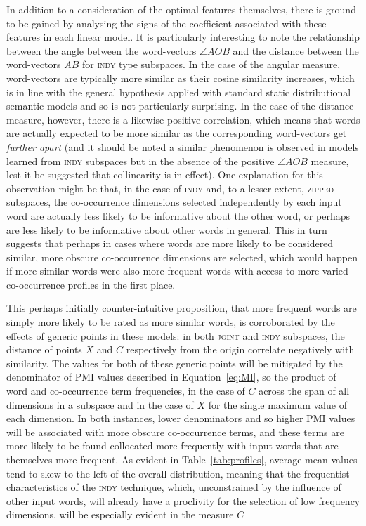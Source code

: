 In addition to a consideration of the optimal features themselves, there is ground to be gained by analysing the signs of the coefficient associated with these features in each linear model.  It is particularly interesting to note the relationship between the angle between the word-vectors $\angle AOB$ and the distance between the word-vectors $\overline{AB}$ for \textsc{indy} type subspaces.  In the case of the angular measure, word-vectors are typically more similar as their cosine similarity increases, which is in line with the general hypothesis applied with standard static distributional semantic models and so is not particularly surprising.  In the case of the distance measure, however, there is a likewise positive correlation, which means that words are actually expected to be more similar as the corresponding word-vectors get \emph{further apart} (and it should be noted a similar phenomenon is observed in models learned from \textsc{indy} subspaces but in the absence of the positive $\angle AOB$ measure, lest it be suggested that collinearity is in effect).  One explanation for this observation might be that, in the case of \textsc{indy} and, to a lesser extent, \textsc{zipped} subspaces, the co-occurrence dimensions selected independently by each input word are actually less likely to be informative about the other word, or perhaps are less likely to be informative about other words in general.  This in turn suggests that perhaps in cases where words are more likely to be considered similar, more obscure co-occurrence dimensions are selected, which would happen if more similar words were also more frequent words with access to more varied co-occurrence profiles in the first place.

This perhaps initially counter-intuitive proposition, that more frequent words are simply more likely to be rated as more similar words, is corroborated by the effects of generic points in these models: in both \textsc{joint} and \textsc{indy} subspaces, the distance of points $X$ and $C$ respectively from the origin correlate negatively with similarity.  The values for both of these generic points will be mitigated by the denominator of PMI values described in Equation~\ref{eq:MI}, so the product of word and co-occurrence term frequencies, in the case of $C$ across the span of all dimensions in a subspace and in the case of $X$ for the single maximum value of each dimension.  In both instances, lower denominators and so higher PMI values will be associated with more obscure co-occurrence terms, and these terms are more likely to be found collocated more frequently with input words that are themselves more frequent.  As evident in Table~\ref{tab:profiles}, average mean values tend to skew to the left of the overall distribution, meaning that the frequentist characteristics of the \textsc{indy} technique, which, unconstrained by the influence of other input words, will already have a proclivity for the selection of low frequency dimensions, will be especially evident in the measure $C$

